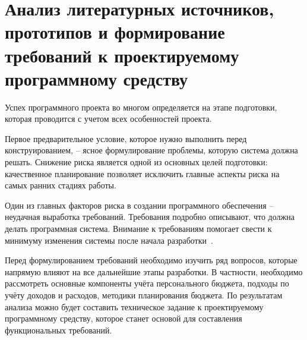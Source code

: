 \section{Анализ литературных источников, прототипов и формирование требований к проектируемому программному средству}
\label{sec:analysis}

Успех программного проекта во многом определяется на этапе подготовки, которая проводится с учетом всех особенностей проекта.

Первое предварительное условие, которое нужно выполнить перед конструированием, -- ясное формулирование проблемы, которую система должна решать.
Снижение риска является одной из основных целей подготовки: качественное планирование позволяет исключить главные аспекты риска на самых ранних стадиях работы.

Один из главных факторов риска в создании программного обеспечения -- не\-удач\-ная выработка требований.
Требования подробно описывают, что должна делать программная система.
Внимание к требованиям помогает свести к минимуму изменения системы после начала разработки~\cite{code_complete}.

Перед формулированием требований необходимо изучить ряд вопросов, которые напрямую влияют на все дальнейшие этапы разработки.
В частности, необходимо рассмотреть основные компоненты учёта персонального бюджета, подходы по учёту доходов и расходов, методики планирования бюджета.
По результатам анализа можно будет составить техническое задание к проектируемому программному средству, которое станет основой для составления функциональных требований.






